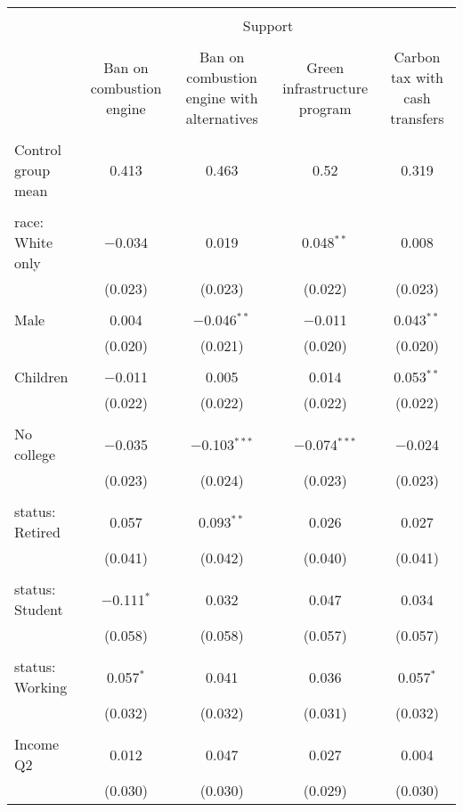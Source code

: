 
\begin{tabular}{@{\extracolsep{5pt}}lcccc} 
\\[-1.8ex]\hline 
\hline \\[-1.8ex] 
 & \multicolumn{4}{c}{Support} \\ 
\cline{2-5} 
\\[-1.8ex] & Ban on combustion engine & Ban on combustion engine with alternatives & Green infrastructure program & Carbon tax with cash transfers \\ 
\hline \\[-1.8ex] 
 Control group mean & 0.413 & 0.463 & 0.52 & 0.319  \\ \hline \\[-1.8ex] race: White only & $-$0.034 & 0.019 & 0.048$^{**}$ & 0.008 \\ 
  & (0.023) & (0.023) & (0.022) & (0.023) \\ 
  & & & & \\ 
 Male & 0.004 & $-$0.046$^{**}$ & $-$0.011 & 0.043$^{**}$ \\ 
  & (0.020) & (0.021) & (0.020) & (0.020) \\ 
  & & & & \\ 
 Children & $-$0.011 & 0.005 & 0.014 & 0.053$^{**}$ \\ 
  & (0.022) & (0.022) & (0.022) & (0.022) \\ 
  & & & & \\ 
 No college & $-$0.035 & $-$0.103$^{***}$ & $-$0.074$^{***}$ & $-$0.024 \\ 
  & (0.023) & (0.024) & (0.023) & (0.023) \\ 
  & & & & \\ 
 status: Retired & 0.057 & 0.093$^{**}$ & 0.026 & 0.027 \\ 
  & (0.041) & (0.042) & (0.040) & (0.041) \\ 
  & & & & \\ 
 status: Student & $-$0.111$^{*}$ & 0.032 & 0.047 & 0.034 \\ 
  & (0.058) & (0.058) & (0.057) & (0.057) \\ 
  & & & & \\ 
 status: Working & 0.057$^{*}$ & 0.041 & 0.036 & 0.057$^{*}$ \\ 
  & (0.032) & (0.032) & (0.031) & (0.032) \\ 
  & & & & \\ 
 Income Q2 & 0.012 & 0.047 & 0.027 & 0.004 \\ 
  & (0.030) & (0.030) & (0.029) & (0.030) \\ 

\end{tabular}
